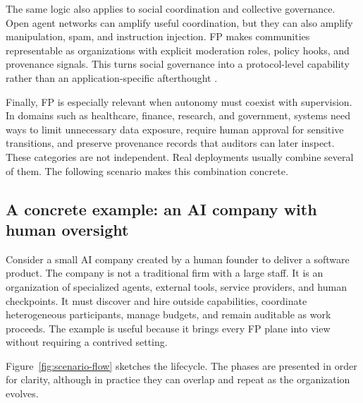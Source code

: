 The same logic also applies to social coordination and collective governance. Open agent networks can amplify useful coordination, but they can also amplify manipulation, spam, and instruction injection. FP makes communities representable as organizations with explicit moderation roles, policy hooks, and provenance signals. This turns social governance into a protocol-level capability rather than an application-specific afterthought \cite{moltbook_site,wired_moltbook,microsoft_openclaw_security}.

Finally, FP is especially relevant when autonomy must coexist with supervision. In domains such as healthcare, finance, research, and government, systems need ways to limit unnecessary data exposure, require human approval for sensitive transitions, and preserve provenance records that auditors can later inspect. These categories are not independent. Real deployments usually combine several of them. The following scenario makes this combination concrete.

\subsection{A concrete example: an AI company with human oversight}
\label{subsec:concrete-example}

Consider a small AI company created by a human founder to deliver a software product. The company is not a traditional firm with a large staff. It is an organization of specialized agents, external tools, service providers, and human checkpoints. It must discover and hire outside capabilities, coordinate heterogeneous participants, manage budgets, and remain auditable as work proceeds. The example is useful because it brings every FP plane into view without requiring a contrived setting.

Figure~\ref{fig:scenario-flow} sketches the lifecycle. The phases are presented in order for clarity, although in practice they can overlap and repeat as the organization evolves.


